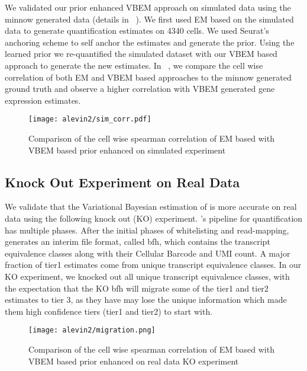 We validated our prior enhanced VBEM approach on simulated data using the minnow generated data (details in
~). We first used EM based \alevin on the simulated data to generate quantification
estimates on 4340 cells. We used Seurat's anchoring scheme to self anchor the estimates and generate the
prior. Using the learned prior we re-quantified the simulated dataset with our VBEM based approach to generate 
the new estimates. In ~, we compare the cell wise correlation of both EM and  VBEM 
based approaches to the minnow generated ground truth and observe a higher correlation with VBEM generated
gene expression estimates.

  \begin{figure}[!htb]
      \centering
    \texttt{[image: alevin2/sim\_corr.pdf]}
    \caption{ Comparison of the cell wise spearman correlation of EM based \alevin with VBEM based
    prior enhanced \alevin on simulated experiment}
    \label{fig:alv2_sim_val}
  \end{figure}

\subsection{Knock Out Experiment on Real Data}
\label{subsec:alv2_real}
We validate that the Variational Bayesian estimation of \alevin is more accurate on real data using the
following knock out (KO) experiment. \Alevin 's pipeline for \dscrnaseq quantification has multiple 
phases. After the initial phases of whitelisting and read-mapping, \alevin generates an interim 
file format, called bfh, which contains the transcript equivalence classes along with their Cellular
Barcode and UMI count. A major fraction of tier1 estimates come from unique transcript equivalence
classes. In our KO experiment, we knocked out all unique transcript equivalence classes, with
the expectation that the KO bfh will migrate some of the tier1 and tier2 estimates to tier 3, as they have
may lose the unique information which made them high confidence tiers (tier1 and tier2) to start with. 

  \begin{figure}[!htb]
      \centering
    \texttt{[image: alevin2/migration.png]}
    \caption{ Comparison of the cell wise spearman correlation of EM based \alevin with  VBEM  based
    prior enhanced \alevin on real data KO experiment}
    \label{fig:alv2_real_val}
  \end{figure}

